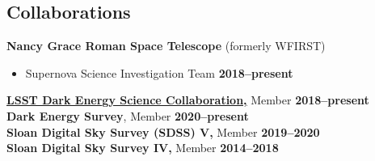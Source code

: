 \documentclass[margin]{res}
\begin{document}
\begin{resume}









\section{Collaborations}
{\bf Nancy Grace Roman Space Telescope} (formerly WFIRST)
\begin{itemize}\itemsep -2pt
 \item[] Supernova Science Investigation Team \hfill {\bf 2018--present}
\end{itemize} \vspace{-12pt}
{\bf \href{http://www.lsst-desc.org}{LSST Dark Energy Science Collaboration,}} Member \hfill {\bf 2018--present}\\
{\bf Dark Energy Survey}, Member \hfill {\bf 2020--present}\\
{\bf Sloan Digital Sky Survey (SDSS) V,} Member \hfill {\bf 2019--2020}\\
{\bf Sloan Digital Sky Survey IV,} Member \hfill {\bf 2014--2018}










\end{resume}
\end{document}
